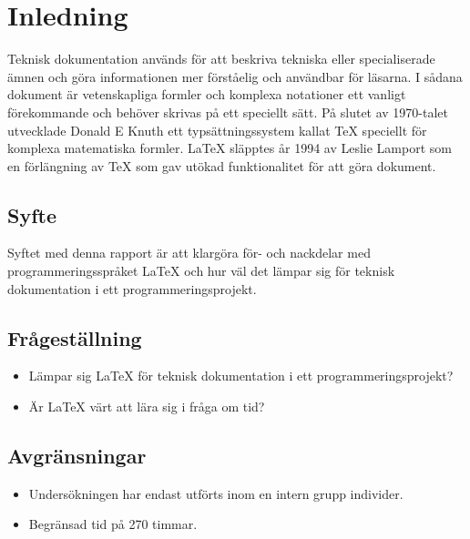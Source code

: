 \section{Inledning}
Teknisk dokumentation används för att beskriva tekniska eller specialiserade ämnen och göra informationen mer förståelig och användbar för läsarna. I sådana dokument är vetenskapliga formler och komplexa notationer ett vanligt förekommande och behöver skrivas på ett speciellt sätt. 
\newline
\newline
På slutet av 1970-talet utvecklade Donald E Knuth ett typsättningssystem kallat {\TeX} speciellt för komplexa matematiska formler. {\LaTeX} släpptes år 1994 av Leslie Lamport som en förlängning av {\TeX} som gav utökad funktionalitet för att göra dokument. \citep{latexandfriends}  

\subsection{Syfte}
Syftet med denna rapport är att klargöra för- och nackdelar med programmeringsspråket {\LaTeX} och hur väl det lämpar sig för teknisk dokumentation i ett programmeringsprojekt. 

\subsection{Frågeställning}
\begin{itemize}
\item Lämpar sig {\LaTeX} för teknisk dokumentation i ett programmeringsprojekt? 
\item Är {\LaTeX} värt att lära sig i fråga om tid?
\end{itemize}
		
\subsection{Avgränsningar}
\begin{itemize}
	\item Undersökningen har endast utförts inom en intern grupp individer.
	\item Begränsad tid på 270 timmar. 
\end{itemize}

	